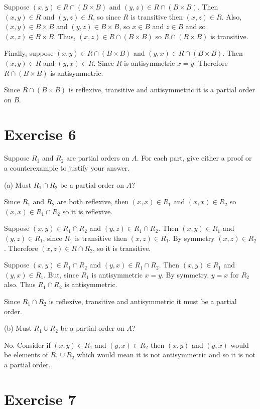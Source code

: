 \documentclass[11pt]{article}
\begin{document}
Suppose $(x, y) \in R \cap (B \times B)$ and $(y, z) \in R \cap (B \times B)$.
Then $(x, y) \in R$ and $(y, z) \in R$, so since $R$ is transitive then
$(x, z) \in R$. Also, $(x, y) \in B \times B$ and $(y, z) \in B \times B$, so 
$x \in B$ and $z \in B$ and so $(x, z) \in B \times B$. Thus, 
$(x, z) \in R \cap (B \times B)$ so $R \cap (B \times B)$ is transitive.

Finally, suppose $(x, y) \in R \cap (B \times B)$ and $(y, x) \in R \cap (B \times B)$.
Then $(x, y) \in R$ and $(y, x) \in R$. Since $R$ is antisymmetric $x = y$.
Therefore $R \cap (B \times B)$ is antisymmetric.

Since $R \cap (B \times B)$ is reflexive, transitive and antisymmetric it is a 
partial order on $B$.

\section*{Exercise 6}

Suppose $R_1$ and $R_2$ are partial orders on $A$. For each part, give either a 
proof or a counterexample to justify your answer. 

\noindent (a) Must $R_1 \cap R_2$ be a partial order on $A$?

Since $R_1$ and $R_2$ are both reflexive, then $(x, x) \in R_1$ and $(x, x) \in R_2$ 
so $(x, x) \in R_1 \cap R_2$ so it is reflexive.

Suppose $(x, y) \in R_1 \cap R_2$ and $(y, z) \in R_1 \cap R_2$. Then 
$(x, y) \in R_1$ and $(y, z) \in R_1$, since $R_1$ is transitive then 
$(x,z) \in R_1$. By symmetry $(x,z) \in R_2$. Therefore $(x, z) \in R \cap R_2$,
so it is transitive.

Suppose $(x, y) \in R_1 \cap R_2$ and $(y, x) \in R_1 \cap R_2$. Then 
$(x, y) \in R_1$ and $(y, x) \in R_1$. But, since $R_1$ is antisymmetric
$x=y$. By symmetry, $y=x$ for $R_2$ also. Thus $R_1 \cap R_2$ is antisymmetric.

Since $R_1 \cap R_2$ is reflexive, transitive and antisymmetric it must be a 
partial order.

\noindent (b) Must $R_1 \cup R_2$ be a partial order on $A$?

No. Consider if $(x, y) \in R_1$ and $(y, x) \in R_2$ then $(x, y)$ and 
$(y, x)$ would be elements of $R_1 \cup R_2$ which would mean it is not 
antisymmetric and so it is not a partial order.

\section*{Exercise 7}
\end{document}
